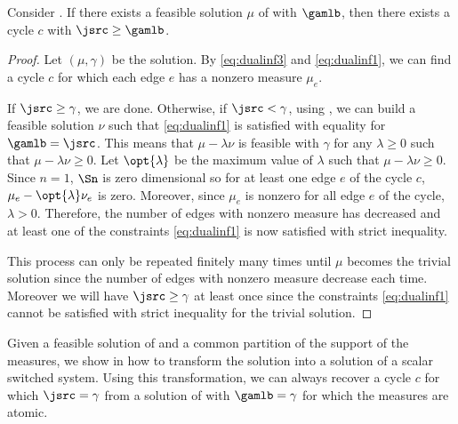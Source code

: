 \documentclass[11pt,twoside,a4paper,openright]{uclouvain-thesis}
\begin{document}
\begin{mylem}
  \label{lem:instabcerts}
  Consider .
  If there exists a feasible solution $\mu$ of  with $\gamlb$,
  then there exists a cycle $c$ with $\jsrc \geq \gamlb$.
  \begin{proof}
    Let $(\mu, \gamma)$ be the solution.
    By \eqref{eq:dualinf3} and \eqref{eq:dualinf1}, we can find a cycle $c$ for which each edge $e$ has a nonzero measure $\mu_e$.

    If $\jsrc \geq \gamma$, we are done.
    Otherwise, if $\jsrc < \gamma$, using ,
    we can build a feasible solution $\nu$ such that \eqref{eq:dualinf1} is satisfied with equality for $\gamlb = \jsrc$.
    This means that $\mu - \lambda \nu$ is feasible with $\gamma$ for any $\lambda \geq 0$ such that $\mu - \lambda \nu \geq 0$.
    Let $\opt{\lambda}$ be the maximum value of $\lambda$ such that $\mu - \lambda \nu \geq 0$.
    Since $n = 1$, $\Sn$ is zero dimensional so for at least one edge $e$ of the cycle $c$, $\mu_e - \opt{\lambda} \nu_e$ is zero.
    Moreover, since $\mu_e$ is nonzero for all edge $e$ of the cycle, $\lambda > 0$.
    Therefore, the number of edges with nonzero measure has decreased and at least one of the constraints \eqref{eq:dualinf1} is now satisfied with strict inequality.

    This process can only be repeated finitely many times until $\mu$ becomes the trivial solution since the number of edges with nonzero measure decrease each time.
    Moreover we will have $\jsrc \geq \gamma$ at least once since the constraints \eqref{eq:dualinf1} cannot be satisfied with strict inequality for the trivial solution.
  \end{proof}
\end{mylem}

Given a feasible solution of  and a common partition of the support of the measures,
we show in  how to transform the solution into a solution of a scalar switched system.
Using this transformation, we can always recover a cycle $c$ for which $\jsrc = \gamma$ from a solution of  with $\gamlb = \gamma$ for which the measures are atomic.
\end{document}
